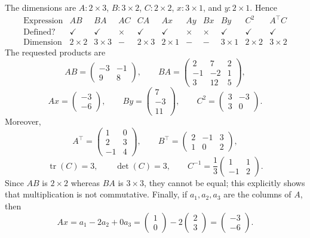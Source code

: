 \documentclass[10pt]{article}
\newcommand{\tr}{\operatorname{tr}}
\begin{document}
The dimensions are $A:2\times3$, $B:3\times2$, $C:2\times2$,
$x:3\times1$, and $y:2\times1$. Hence
\[
\begin{array}{c|cccccccccc}
\text{Expression}&AB&BA&AC&CA&Ax&Ay&Bx&By&C^2&A^\top C\\ \hline
\text{Defined?}&\checkmark&\checkmark&\times&\checkmark&\checkmark&\times&\times&\checkmark&\checkmark&\checkmark\\
\text{Dimension}&2\times2&3\times3&-&2\times3&2\times1&-&-&3\times1&2\times2&3\times2
\end{array}
\]
The requested products are
\[
AB=\begin{pmatrix}-3&-1\\9&8\end{pmatrix},\qquad
BA=\begin{pmatrix}2&7&2\\-1&-2&1\\3&12&5\end{pmatrix},
\]
\[
Ax=\begin{pmatrix}-3\\-6\end{pmatrix},\qquad
By=\begin{pmatrix}7\\-3\\11\end{pmatrix},\qquad
C^2=\begin{pmatrix}3&-3\\3&0\end{pmatrix}.
\]
Moreover,
\[
A^\top=\begin{pmatrix}1&0\\2&3\\-1&4\end{pmatrix},\qquad
B^\top=\begin{pmatrix}2&-1&3\\1&0&2\end{pmatrix},
\]
\[
\tr(C)=3,\qquad \det(C)=3,\qquad
C^{-1}=\frac13\begin{pmatrix}1&1\\-1&2\end{pmatrix}.
\]
Since $AB$ is $2\times2$ whereas $BA$ is $3\times3$, they cannot be equal;
this explicitly shows that multiplication is not commutative. Finally, if
$a_1,a_2,a_3$ are the columns of $A$, then
\[
Ax=a_1-2a_2+0a_3
=\begin{pmatrix}1\\0\end{pmatrix}
-2\begin{pmatrix}2\\3\end{pmatrix}
=\begin{pmatrix}-3\\-6\end{pmatrix}.
\]
\end{document}
